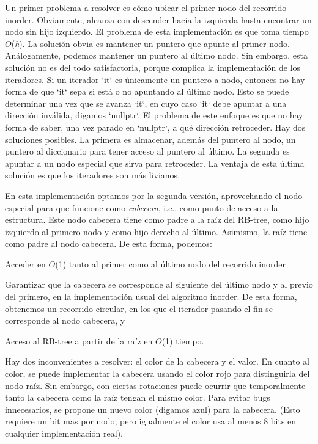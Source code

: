\-Un primer problema a resolver es cómo ubicar el primer nodo del recorrido inorder. \-Obviamente, alcanza con descender hacia la izquierda hasta encontrar un nodo sin hijo izquierdo. \-El problema de esta implementación es que toma tiempo $O$({\itshape h\/}). \-La solución obvia es mantener un puntero que apunte al primer nodo. \-Análogamente, podemos mantener un puntero al último nodo. \-Sin embargo, esta solución no es del todo satisfactoria, porque complica la implementación de los iteradores. \-Si un iterador `it` es únicamente un puntero a nodo, entonces no hay forma de que `it` sepa si está o no apuntando al último nodo. \-Esto se puede determinar una vez que se avanza `it`, en cuyo caso `it` debe apuntar a una dirección inválida, digamos `nullptr`. \-El problema de este enfoque es que no hay forma de saber, una vez parado en `nullptr`, a qué dirección retroceder. \-Hay dos soluciones posibles. \-La primera es almacenar, además del puntero al nodo, un puntero al diccionario para tener acceso al puntero al último. \-La segunda es apuntar a un nodo especial que sirva para retroceder. \-La ventaja de esta última solución es que los iteradores son más livianos.

\-En esta implementación optamos por la segunda versión, aprovechando el nodo especial para que funcione como {\itshape cabecera\/}, i.\-e., como punto de acceso a la estructura. \-Este nodo cabecera tiene como padre a la raíz del \-R\-B-\/tree, como hijo izquierdo al primero nodo y como hijo derecho al último. \-Asimismo, la raíz tiene como padre al nodo cabecera. \-De esta forma, podemos\-:
\begin{DoxyEnumerate}
\item \-Acceder en $O$(1) tanto al primer como al último nodo del recorrido inorder
\item \-Garantizar que la cabecera se corresponde al siguiente del último nodo y al previo del primero, en la implementación usual del algoritmo inorder. \-De esta forma, obtenemos un recorrido circular, en los que el iterador pasando-\/el-\/fin se corresponde al nodo cabecera, y
\item \-Acceso al \-R\-B-\/tree a partir de la raíz en $O$(1) tiempo.
\end{DoxyEnumerate}

\-Hay dos inconvenientes a resolver\-: el color de la cabecera y el valor. \-En cuanto al color, se puede implementar la cabecera usando el color rojo para distinguirla del nodo raíz. \-Sin embargo, con ciertas rotaciones puede ocurrir que temporalmente tanto la cabecera como la raíz tengan el mismo color. \-Para evitar bugs innecesarios, se propone un nuevo color (digamos azul) para la cabecera. (\-Esto requiere un bit mas por nodo, pero igualmente el color usa al menos 8 bits en cualquier implementación real).

